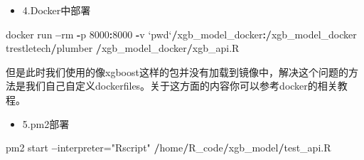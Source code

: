 \documentclass[]{book}
\newenvironment{Shaded}{\begin{snugshade}}{\end{snugshade}}
\newcommand{\KeywordTok}[1]{\textcolor[rgb]{0.13,0.29,0.53}{\textbf{#1}}}
\newcommand{\DataTypeTok}[1]{\textcolor[rgb]{0.13,0.29,0.53}{#1}}
\newcommand{\DecValTok}[1]{\textcolor[rgb]{0.00,0.00,0.81}{#1}}
\newcommand{\StringTok}[1]{\textcolor[rgb]{0.31,0.60,0.02}{#1}}
\newcommand{\OperatorTok}[1]{\textcolor[rgb]{0.81,0.36,0.00}{\textbf{#1}}}
\newcommand{\ErrorTok}[1]{\textcolor[rgb]{0.64,0.00,0.00}{\textbf{#1}}}
\newcommand{\NormalTok}[1]{#1}
\providecommand{\tightlist}{%
  \setlength{\itemsep}{0pt}\setlength{\parskip}{0pt}}
\begin{document}
\begin{Shaded}
\end{Shaded}

\begin{itemize}
\tightlist
\item
  4.Docker中部署
\end{itemize}

\begin{Shaded}
\begin{Highlighting}[]
\NormalTok{docker run }\OperatorTok{--}\NormalTok{rm }\OperatorTok{-}\NormalTok{p }\DecValTok{8000}\OperatorTok{:}\DecValTok{8000} \OperatorTok{-}\NormalTok{v }\StringTok{`}\DataTypeTok{pwd}\StringTok{`}\OperatorTok{/}\NormalTok{xgb_model_docker}\OperatorTok{:}\ErrorTok{/}\NormalTok{xgb_model_docker trestletech}\OperatorTok{/}\NormalTok{plumber }\OperatorTok{/}\NormalTok{xgb_model_docker}\OperatorTok{/}\NormalTok{xgb_api.R}
\end{Highlighting}
\end{Shaded}

但是此时我们使用的像xgboost这样的包并没有加载到镜像中，解决这个问题的方法是我们自己自定义dockerfiles。关于这方面的内容你可以参考docker的相关教程。

\begin{itemize}
\tightlist
\item
  5.pm2部署
\end{itemize}

\begin{Shaded}
\begin{Highlighting}[]
\NormalTok{pm2 start }\OperatorTok{--}\NormalTok{interpreter=}\StringTok{"Rscript"} \OperatorTok{/}\NormalTok{home}\OperatorTok{/}\NormalTok{R_code}\OperatorTok{/}\NormalTok{xgb_model}\OperatorTok{/}\NormalTok{test_api.R}
\end{Highlighting}
\end{Shaded}
\end{document}
